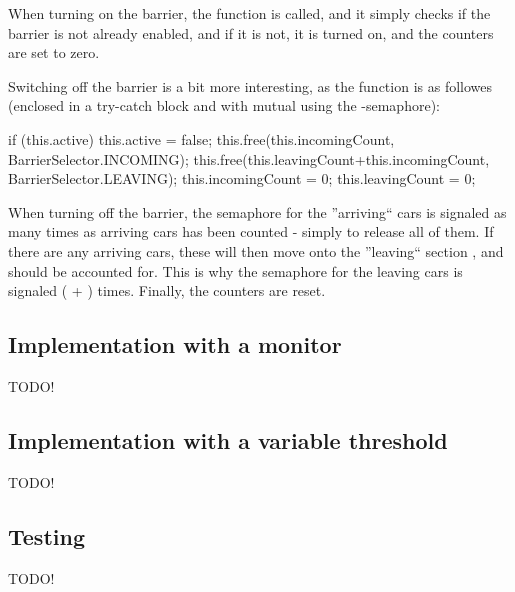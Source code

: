 When turning on the barrier, the function  is called, and it simply checks if the barrier is not already enabled, and if it is not, it is turned on, and the counters are set to zero.

Switching off the barrier is a bit more interesting, as the function  is as followes (enclosed in a try-catch block and with mutual using the -semaphore):

\begin{java}
if (this.active) {
	this.active = false;
	this.free(this.incomingCount, BarrierSelector.INCOMING);
	this.free(this.leavingCount+this.incomingCount, BarrierSelector.LEAVING);
	this.incomingCount = 0;
	this.leavingCount = 0;
}
\end{java}

When turning off the barrier, the semaphore for the ''arriving`` cars is signaled as many times as arriving cars has been counted - simply to release all of them. If there are any arriving cars, these will then move onto the ''leaving`` section , and should be accounted for. This is why the semaphore for the leaving cars is signaled ( + ) times. Finally, the counters are reset.

\subsection{Implementation with a monitor}
\label{sub:bar-moni}
TODO!

\subsection{Implementation with a variable threshold}
\label{sub:bar-thres}
TODO!


\subsection{Testing}
\label{sub:bar-test}
TODO!